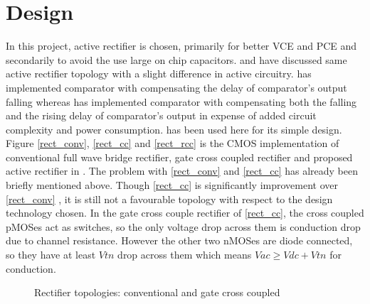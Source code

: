 \documentclass[12pt,a4paper,UKenglish]{report}
\begin{document}
\section{Design}	%

In this project, active rectifier is chosen, primarily for better VCE and PCE and secondarily to avoid the use large on chip capacitors. \cite{rectrcc}  and \cite{rectcomp} have discussed same active rectifier topology with a slight difference in active circuitry. \cite{rectrcc} has implemented comparator with compensating the delay of comparator's output falling whereas \cite{rectcomp} has implemented comparator with compensating both the falling and the rising delay of comparator's output in expense of added circuit complexity and power consumption. \cite{rectrcc} has been used here for its simple design. \\

Figure \ref{rect_conv}, \ref{rect_cc} and \ref{rect_rcc} is the CMOS implementation of conventional full wave bridge rectifier, gate cross coupled rectifier and proposed active rectifier in \cite{rectrcc}. The problem with \ref{rect_conv} and \ref{rect_cc} has already been briefly mentioned above. Though  \ref{rect_cc}  is significantly improvement over  \ref{rect_conv} , it is still not a favourable topology with respect to the design technology chosen. In the gate cross couple rectifier of  \ref{rect_cc}, the cross coupled pMOSes act as switches, so the only voltage drop across them is conduction drop due to channel resistance. However the other two nMOSes are diode connected, so they have at least $Vtn$ drop across them which means $Vac \geq Vdc + Vtn$ for conduction. \\

\begin{figure} [htbp]
  \centering 
\hfill
 \caption{Rectifier topologies: conventional and gate cross coupled} 
\label{rect_conv_cc} 
\end{figure}
\end{document}
